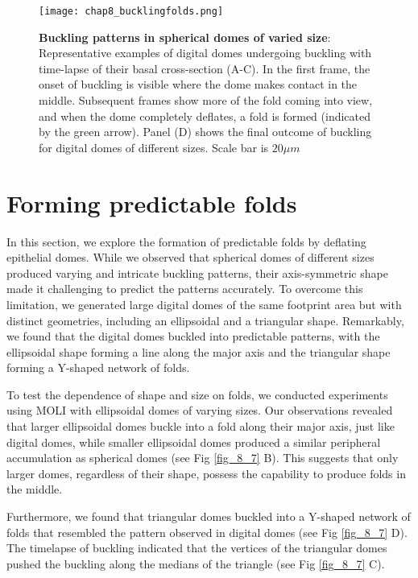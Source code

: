 \newpage

\vspace{3cm}

\begin{figure}
	\centering
	\texttt{[image: chap8\_bucklingfolds.png]}
	\caption{\label{fig_8_6} \textbf{Buckling patterns in spherical domes of varied size}: Representative examples of digital domes undergoing buckling with time-lapse of their basal cross-section (A-C). In the first frame, the onset of buckling is visible where the dome makes contact in the middle. Subsequent frames show more of the fold coming into view, and when the dome completely deflates, a fold is formed (indicated by the green arrow). Panel (D) shows the final outcome of buckling for digital domes of different sizes. Scale bar is $20 \mu m$	}
\end{figure}



\clearpage
\hypertarget{forming-predictable-folds}{%
	\section{Forming predictable folds}\label{forming-predictable-folds}}

In this section, we explore the formation of predictable folds by deflating epithelial domes. While we observed that spherical domes of different sizes produced varying and intricate buckling patterns, their axis-symmetric shape made it challenging to predict the patterns accurately. To overcome this limitation, we generated large digital domes of the same footprint area but with distinct geometries, including an ellipsoidal and a triangular shape. Remarkably, we found that the digital domes buckled into predictable patterns, with the ellipsoidal shape forming a line along the major axis and the triangular shape forming a Y-shaped network of folds.

To test the dependence of shape and size on folds, we conducted experiments using MOLI with ellipsoidal domes of varying sizes. Our observations revealed that larger ellipsoidal domes buckle into a fold along their major axis, just like digital domes, while smaller ellipsoidal domes produced a similar peripheral accumulation as spherical domes (see Fig \ref{fig_8_7} B). This suggests that only larger domes, regardless of their shape, possess the capability to produce folds in the middle.
 
Furthermore, we found that triangular domes buckled into a Y-shaped network of folds that resembled the pattern observed in digital domes (see Fig \ref{fig_8_7} D). The timelapse of buckling indicated that the vertices of the triangular domes pushed the buckling along the medians of the triangle (see Fig \ref{fig_8_7} C).

